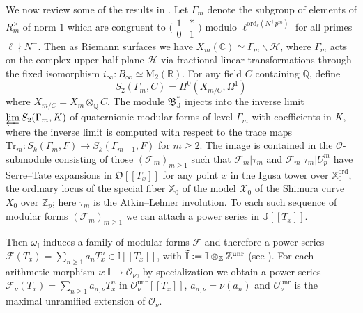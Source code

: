 \documentclass[a4paper,11pt]{amsart}
\numberwithin{equation}{section}
\theoremstyle{plain}
\theoremstyle{definition}
\theoremstyle{remark}
\newcommand{\Q}{\mathbb Q}
\newcommand{\Z}{\mathbb Z}
\newcommand{\R}{\mathbb R}
\newcommand{\C}{\mathbb C}
\newcommand{\I}{\mathbb{I}}
\newcommand{\J}{\mathbb{J}}
\newcommand{\defeq}{\vcentcolon=}
\newcommand{\ord}{\mathrm{ord}}
\newcommand{\unr}{\mathrm{unr}}
\newcommand{\smallmat}[4]{\bigl(\begin{smallmatrix}#1&#2\\#3&#4\end{smallmatrix}\bigr)}
\newcommand{\invlim}{\mathop{\varprojlim}\limits}
\begin{document}
We now review some of the results in \cite{LMW}.
Let $\Gamma_m$ denote the subgroup of elements of $R_m^\times$ of norm $1$ which are congruent to $\smallmat 1*01$ modulo $\ell^{\ord_\ell(N^+p^m)}$ for all primes $\ell\nmid N^-$. Then as Riemann surfaces we have $X_m(\C)\simeq\Gamma_m\backslash\mathcal{H}$, where $\Gamma_m$ acts on the complex upper half plane $\mathcal{H}$ via fractional linear transformations through the fixed isomorphism $i_\infty\colon B_\infty\simeq \mathrm{M}_2(\R)$. For any field $C$ containing $\Q$, define 
\[S_2(\Gamma_m,C)=H^0(X_{m/C},\Omega^1)\]
where $X_{m/C}=X_m\otimes_\Q C$. 
The module $\mathfrak{B}_\J^*$ injects into the inverse limit $\invlim S_2(\Gamma_m,K)$ of quaternionic modular forms of level $\Gamma_m$ with coefficients in $K$, where the inverse limit is computed with respect to the trace maps $\mathrm{Tr}_m\colon S_k(\Gamma_m,F)\rightarrow S_k(\Gamma_{m-1},F)$ for $m\geq 2$. 
The image is contained in the $\mathcal{O}$-submodule consisting of those $(\mathcal{F}_m)_{m\geq1}$ such that 
$\mathcal{F}_m|\tau_m$ and $\mathcal{F}_m|\tau_m|U_p^m$ have Serre--Tate expansions in $\mathfrak{O}[[T_x]]$ for any point $x$ in the Igusa tower over $\mathbb{X}_0^\ord$, the ordinary locus of the special fiber $\mathbb{X}_0$ of the model $\mathcal{X}_0$ of the Shimura curve $X_0$ over $\Z_p$; here $\tau_m$ is the Atkin--Lehner involution. To each such sequence of modular forms $(\mathcal{F}_m)_{m\geq 1}$ we can attach a power series in $\J[[T_x]]$.

Then $\omega_\I$ induces a family of modular forms $\boldsymbol{\mathcal{F}}$ and therefore a power series $\boldsymbol{\mathcal{F}}(T_x)=\sum_{n\geq 1}a_nT_x^n\in\widetilde{\I}[[T_x]]$, with $\widetilde{\I}\defeq \I\otimes_{\Z}\Z^{\unr}$ (see \cite[Lemma 5.9]{LMW}). For each arithmetic morphism $\nu\colon\mathbb{I}\rightarrow \mathcal{O}_\nu$, 
by specialization we obtain a power series $\mathcal{F}_\nu(T_x)=\sum_{n\geq 1}a_{n,\nu}T_x^n$ in $\mathcal{O}_\nu^\unr[[T_x]]$, $a_{n,\nu}=\nu(a_n)$ and $\mathcal{O}_\nu^\unr$ is the maximal unramified extension of $\mathcal{O}_\nu$. 
\end{document}
